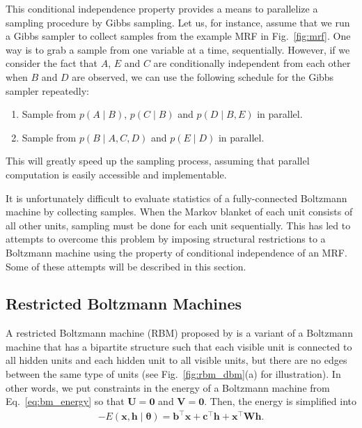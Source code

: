 \documentclass{now}
\newcommand{\vect}[1]{\mathbf{#1}}
\newcommand{\vects}[1]{\boldsymbol{#1}}
\newcommand{\matr}[1]{\mathbf{#1}}
\newcommand{\vb}[0]{\vect{b}}
\newcommand{\vc}[0]{\vect{c}}
\newcommand{\vh}[0]{\vect{h}}
\newcommand{\vx}[0]{\vect{x}}
\newcommand{\mW}[0]{\matr{W}}
\newcommand{\mU}[0]{\matr{U}}
\newcommand{\mV}[0]{\matr{V}}
\newcommand{\mzero}[0]{\matr{0}}
\newcommand{\TT}[0]{{\vects{\theta}}}
\begin{document}
This conditional independence property provides a means to parallelize a
sampling procedure by Gibbs sampling. Let us, for instance, assume that we run a
Gibbs sampler to collect samples from the example MRF in Fig.~\ref{fig:mrf}. One
way is to grab a sample from one variable at a time, sequentially. However, if
we consider the fact that $A$, $E$ and $C$ are conditionally independent from
each other when $B$ and $D$ are observed, we can use the following schedule for
the Gibbs sampler repeatedly:
\begin{enumerate}
    \itemsep 0em
    \item Sample from $p(A\mid B)$, $p(C \mid B)$ and $p(D \mid B, E)$ in
        parallel.
    \item Sample from $p(B \mid A, C, D)$ and $p(E \mid D)$ in parallel.
\end{enumerate}
This will greatly speed up the sampling process, assuming that parallel
computation is easily accessible and implementable.

It is unfortunately difficult to evaluate statistics of a fully-connected
Boltzmann machine by collecting samples. When the Markov blanket of each unit
consists of all other units, sampling must be done for each unit sequentially.
This has led to attempts to overcome this problem by imposing structural
restrictions to a Boltzmann machine using the property of conditional
independence of an MRF. Some of these attempts will be described in this
section.

\subsection{Restricted Boltzmann Machines}
\label{sec:rbm}

A restricted Boltzmann machine (RBM) proposed by \citet{Smolensky1986} is a
variant of a Boltzmann machine that has a bipartite structure such that each
visible unit is connected to all hidden units and each hidden unit to all
visible units, but there are no edges between the same type of units (see
Fig.~\ref{fig:rbm_dbm}(a) for illustration). In other words, we put constraints
in the energy of a Boltzmann machine from Eq.~\eqref{eq:bm_energy} so that $\mU
= \mzero$ and $\mV = \mzero$.  Then, the energy is simplified into 
\begin{align}
    \label{eq:rbm_energy}
    -E(\vx, \vh \mid \TT) = \vb^\top \vx + \vc^\top \vh + \vx^\top \mW \vh.
\end{align}
\end{document}
